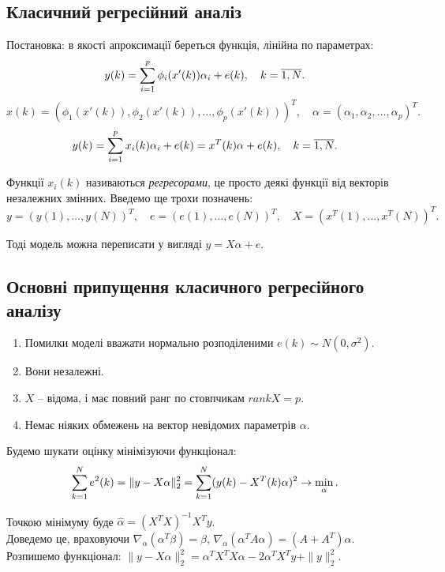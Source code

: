 \subsection{Класичний регресійний аналіз}

Постановка: в якості апроксимації береться функція, лінійна по параметрах: 
\[ y(k) = \displaystyle\sum\limits_{i=1}^p \phi_i(x'(k)) \alpha_i + e(k), \quad k = \overline{1,N}. \]
\[ x(k) = (\phi_1(x'(k)), \phi_2(x'(k)), \ldots, \phi_p(x'(k)))^T, \quad \alpha = (\alpha_1, \alpha_2, \ldots, \alpha_p)^T. \]
\[ y(k) = \displaystyle\sum\limits_{i=1}^p x_i(k) \alpha_i + e(k) = x^T(k) \alpha + e(k), \quad k=\overline{1,N}. \]

Функції $x_i(k)$ називаються \textit{регресорами}, це просто деякі функції від векторів незалежних змінних. Введемо ще трохи позначень:
\[ y = (y(1), \ldots, y(N))^T,\quad e = (e(1), \ldots, e(N))^T, \quad X = (x^T(1), \ldots, x^T(N))^T. \]

Тоді модель можна переписати у вигляді $y = X\alpha + e$. \\

\subsection{Основні припущення класичного регресійного аналізу}

\begin{enumerate}
	\item Помилки моделі вважати нормально розподіленими $e(k) \sim N(0, \sigma^2)$.
	
	\item Вони незалежні.

	\item $X$ -- відома, і має повний ранг по стовпчикам $rank X = p$.
	
	\item Немає ніяких обмежень на вектор невідомих параметрів $\alpha$.
\end{enumerate}

Будемо шукати оцінку мінімізуючи функціонал: 
\[ \displaystyle\sum\limits_{k=1}^N e^2(k) = \|y - X\alpha\|_2^2 = \displaystyle\sum\limits_{k=1}^N (y(k) - X^T(k)\alpha)^2 \to \min_\alpha. \]

Точкою мінімуму буде $\widehat{\alpha} = (X^TX)^{-1}X^T y$. \\

Доведемо це, враховуючи $\nabla_\alpha(\alpha^T\beta)=\beta$, $\nabla_\alpha(\alpha^TA\alpha)=(A+A^T)\alpha$. \\

Розпишемо функціонал: $ \|y - X\alpha\|_2^2 = \alpha^TX^TX\alpha-2\alpha^TX^Ty+\|y\|_2^2$.

